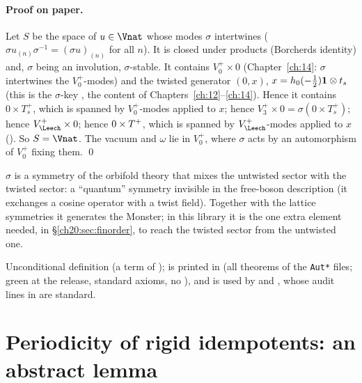 \paragraph{Proof on paper.}  Let $S$ be the space of $u\in\Vnat$ whose modes $\sigma$ intertwines
($\sigma u_{(n)}\sigma^{-1}=(\sigma u)_{(n)}$ for all $n$).  It is closed under products (Borcherds identity) and, $\sigma$
being an involution, $\sigma$-stable.  It contains $V_0^+\times0$ (Chapter~\ref{ch:14}: $\sigma$ intertwines the
$V_0^+$-modes) and the twisted generator $(0,x)$, $x=h_0(-\tfrac12)\mathbf 1\otimes t_s$ (this is the $\sigma$-key
, the content of Chapters~\ref{ch:12}--\ref{ch:14}).  Hence it contains $0\times T_s^+$, which is
spanned by $V_0^+$-modes applied to $x$; hence $V_3^+\times0=\sigma(0\times T_s^+)$; hence $\chtwentyVL\times0$; hence
$0\times T^{+}$, which is spanned by $\chtwentyVL$-modes applied to $x$ ().  So $S=\Vnat$.  The
vacuum and $\omega$ lie in $V_0^+$, where $\sigma$ acts by an automorphism of $V_0^+$ fixing them. \qed
\begin{physics}
$\sigma$ is a symmetry of the orbifold theory that mixes the untwisted sector with the twisted sector: a ``quantum''
symmetry invisible in the free-boson description (it exchanges a cosine operator with a twist field).  Together with
the lattice symmetries it generates the Monster; in this library it is the one extra element needed, in
\S\ref{ch20:sec:finorder}, to reach the twisted sector from the untwisted one.
\end{physics}
\begin{status}
Unconditional definition (a term of );  is printed in  (all theorems of the \texttt{Aut*} files; green at the release, standard axioms, no ), and
 is used by  and , whose audit lines in
 are standard.
\end{status}

\section{Periodicity of rigid idempotents: an abstract lemma}\label{ch20:sec:periodic}

